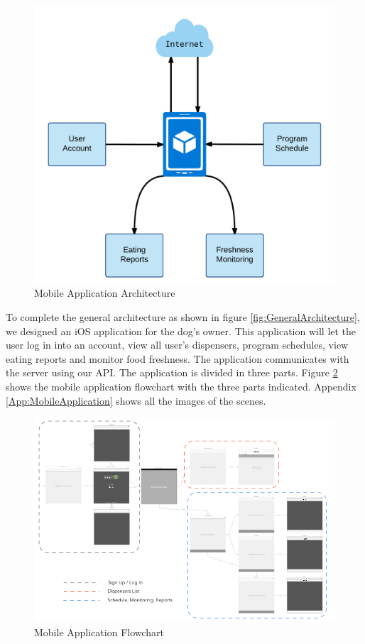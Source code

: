 \documentclass[12pt]{article}
\begin{document}
\begin{figure}[!htb]
  \begin{center}
    \includegraphics[scale=0.2]{Figures/ArchitectureApplication}
  \end{center}
  \caption{Mobile Application Architecture}
  \label{fig:AppArchitecture}
\end{figure}

To complete the general architecture as shown in figure \ref{fig:GeneralArchitecture}, we designed an iOS application for the dog's owner. This application will let the user log in into an account, view all user's dispensers, program schedules, view eating reports and monitor food freshness. The application communicates with the server using our API. The application is divided in three parts. Figure \ref{fig:AppFlowchart} shows the mobile application flowchart with the three parts indicated. Appendix \ref{App:MobileApplication} shows all the images of the scenes.

\begin{figure}[!htb]
  \includegraphics[scale=0.6]{Figures/MobileAppScenes}
  \caption{Mobile Application Flowchart}
  \label{fig:AppFlowchart}
\end{figure}
\end{document}
